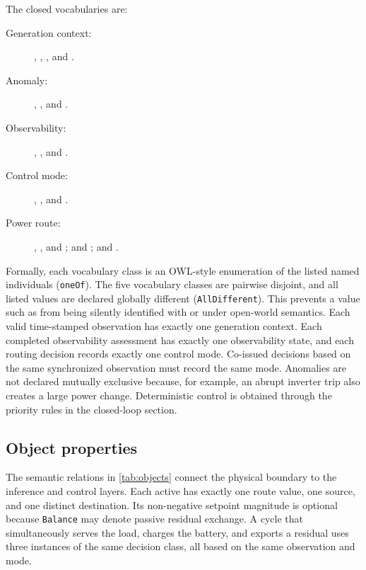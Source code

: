 The closed vocabularies are:
\begin{description}
	\item[Generation context:] , , , and .
	\item[Anomaly:] , , and .
	\item[Observability:] , , and .
	\item[Control mode:] , , and .
	\item[Power route:] , , and ;\newline
	 and ;\newline
	 and .
\end{description}
Formally, each vocabulary class is an OWL-style enumeration of the listed named individuals (\texttt{oneOf}). The five vocabulary classes are pairwise disjoint, and all listed values are declared globally different (\texttt{AllDifferent}). This prevents a value such as  from being silently identified with  or  under open-world semantics.
Each valid time-stamped observation has exactly one generation context. Each completed observability assessment has exactly one observability state, and each routing decision records exactly one control mode. Co-issued decisions based on the same synchronized observation must record the same mode. Anomalies are not declared mutually exclusive because, for example, an abrupt inverter trip also creates a large power change. Deterministic control is obtained through the priority rules in the closed-loop section.

\subsection{Object properties}

The semantic relations in \autoref{tab:objects} connect the physical boundary to the inference and control layers. Each active  has exactly one route value, one source, and one distinct destination. Its non-negative setpoint magnitude is optional because \texttt{Balance} may denote passive residual exchange. A cycle that simultaneously serves the load, charges the battery, and exports a residual uses three instances of the same decision class, all based on the same observation and mode.

